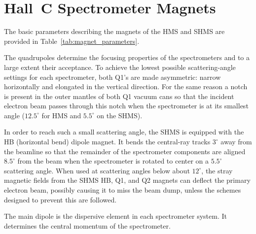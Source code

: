 \section{Hall~C Spectrometer Magnets}

The basic parameters describing the magnets of the HMS and SHMS are provided in
Table~\ref{tab:magnet_parameters}.

The quadrupoles determine the focusing properties of the spectrometers
and to a large extent their acceptance.
To achieve the lowest possible scattering-angle
settings for each spectrometer, both Q1's are
made asymmetric: narrow horizontally and elongated in the vertical direction. For the same
reason a notch is present in the outer mantles of both Q1 vacuum cans so
that the incident electron beam passes through this notch when the
spectrometer is at its smallest angle ($12.5^{\circ}$ for HMS and $5.5^{\circ}$ on the SHMS).

In order to reach such a small scattering angle, the SHMS is equipped with the HB
(horizontal bend) dipole magnet. It bends the central-ray tracks $3^{\circ}$ away from the
beamline so that the remainder of the spectrometer components are aligned $8.5^{\circ}$
from the beam when the spectrometer is rotated to center on a $5.5^{\circ}$ scattering angle.
When used at scattering angles below about $12^{\circ}$, the stray magnetic fields from
the SHMS HB, Q1, and Q2 magnets can deflect the primary electron beam, possibly
causing it to miss the beam dump, unless the schemes designed to prevent this are followed.

The main dipole is the dispersive element in each spectrometer system. It
determines the central momentum of the spectrometer.



